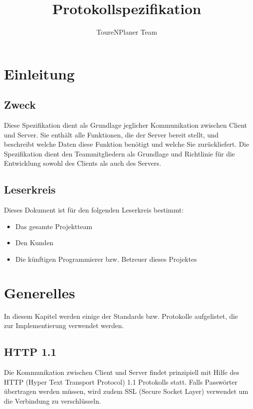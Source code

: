 \documentclass[ngerman]{scrartcl}
\title{Protokollspezifikation}
\author{ToureNPlaner Team}
\begin{document}
\maketitle

\tableofcontents

\pagebreak

\section{Einleitung}

	\subsection{Zweck}
	
	Diese Spezifikation dient als Grundlage jeglicher Kommunikation zwischen Client und Server. 
	Sie enthält alle Funktionen, die der Server bereit stellt, und beschreibt welche Daten diese Funktion benötigt und welche Sie zurückliefert. 
	Die Spezifikation dient den Teammitgliedern als Grundlage und Richtlinie für die Entwicklung sowohl des Clients als auch des Servers.
	
	\subsection{Leserkreis}
	
	Dieses Dokument ist für den folgenden Leserkreis bestimmt:
	
	\begin{itemize}
		\item Das gesamte Projektteam
		\item Den Kunden
		\item Die künftigen Programmierer bzw. Betreuer dieses Projektes
	\end{itemize}
	
\section{Generelles}

	In diesem Kapitel werden einige der Standards bzw. Protokolle aufgelistet, die zur Implementierung verwendet werden.

	\subsection{HTTP 1.1}

	Die Kommunikation zwischen Client und Server findet prinzipiell mit Hilfe des HTTP (Hyper Text Transport Protocol) 1.1 Protokolls statt. 
	Falls Passwörter übertragen werden müssen, wird zudem SSL (Secure Socket Layer) verwendet um die Verbindung zu verschlüsseln.\\ 
	
\end{document}
